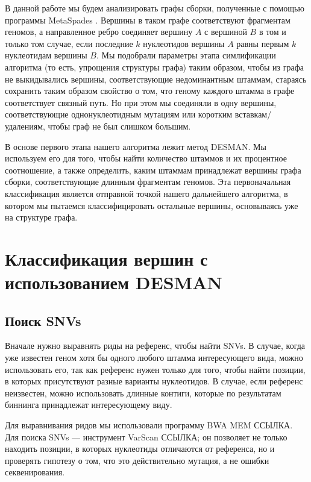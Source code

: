 \documentclass{spbau-diploma}
\begin{document}
В данной работе мы будем анализировать графы сборки, полученные с помощью программы MetaSpades \cite{MetaSpades}. Вершины в таком графе соответствуют фрагментам геномов, а направленное ребро соединяет вершину $A$ с вершиной $B$ в том и только том случае, если последние $k$ нуклеотидов вершины $A$ равны первым $k$ нуклеотидам вершины $B$. Мы подобрали параметры этапа симлификации алгоритма (то есть, упрощения структуры графа) таким образом, чтобы из графа не выкидывались вершины, соответствующие недоминантным штаммам, стараясь сохранить таким образом свойство о том, что геному каждого штамма в графе соответствует связный путь. Но при этом мы соединяли в одну вершины, соответствующие однонуклеотидным мутациям или коротким вставкам/удалениям, чтобы граф не был слишком большим.

В основе первого этапа нашего алгоритма лежит метод DESMAN. Мы используем его для того, чтобы найти количество штаммов и их процентное соотношение, а также определить, каким штаммам принадлежат вершины графа сборки, соответствующие длинным фрагментам геномов. Эта первоначальная классификация является отправной точкой нашего дальнейшего алгоритма, в котором мы пытаемся классифицировать остальные вершины, основываясь уже на структуре графа.



\section{Классификация вершин с использованием DESMAN}


\subsection{Поиск SNVs}

Вначале нужно выравнять риды на референс, чтобы найти SNVs. В случае, когда уже известен геном хотя бы одного любого штамма интересующего вида, можно использовать его, так как референс нужен только для того, чтобы найти позиции, в которых присутствуют разные варианты нуклеотидов. В случае, если референс неизвестен, можно использовать длинные контиги, которые по результатам биннинга принадлежат интересующему виду. 

Для выравнивания ридов мы использовали программу BWA MEM ССЫЛКА. Для поиска SNVs --- инструмент VarScan ССЫЛКА; он позволяет не только находить позиции, в которых нуклеотиды отличаются от референса, но и проверять гипотезу о том, что это действительно мутация, а не ошибки секвенирования. 
\end{document}
